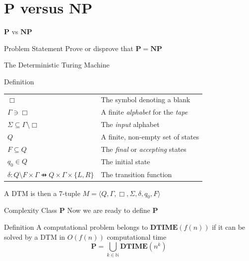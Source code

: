 \documentclass[handout]{beamer}
\newcommand{\Natural}{\mathbb{N}}
\newcommand{\PTIME}{\mathbf{P}}
\newcommand{\NPTIME}{\mathbf{NP}}
\newcommand{\DTIME}{\mathbf{DTIME}}
\begin{document}
  \section{$\PTIME$ versus $\NPTIME$}
  \begin{frame}{$\PTIME$ vs $\NPTIME$}
      \begin{block}{Problem Statement}
          Prove or disprove that $\PTIME = \NPTIME$
      \end{block}
  \end{frame}
  \begin{frame}{The Deterministic Turing Machine}
      \pause
      \begin{block}{Definition}
          \pause
          \begin{table}[]
              \centering
              \begin{tabular}{ll}
                  $\Box$ & The symbol denoting a blank \pause \\
                  $\Gamma \ni \Box$
                  & A finite \textit{alphabet} for the \textit{tape} \pause \\
                  $\Sigma \subseteq \Gamma \setminus \Box$ 
                  & The \textit{input} alphabet \pause \\
                  $Q$ & A finite, non-empty set of states \pause \\
                  $F \subseteq Q$
                  & The \textit{final} or \textit{accepting} states \pause \\
                  $q_0 \in Q$ & The initial state \pause \\
                  $\delta: Q \setminus F \times \Gamma \pfun Q
                  \times \Gamma \times \{L, R\}$ & The transition function
              \end{tabular}
          \end{table}
          \pause
          A DTM is then a 7-tuple
          $M = \langle Q, \Gamma, \Box, \Sigma, \delta, q_0, F \rangle$
      \end{block}
  \end{frame}
  \begin{frame}{Complexity Class $\PTIME$}
      Now we are ready to define $\PTIME$
      \pause
      \begin{block}{Definition}
          A computational problem belongs to
              $\DTIME\left(f(n)\right)$ if it can be solved by a
              DTM in $O(f(n))$ computational time 
              \pause
          $$\PTIME = \bigcup_{k \in \Natural}
              \DTIME\left(n^k\right)$$
      \end{block}
  \end{frame}
\end{document}

